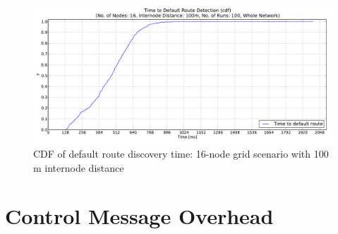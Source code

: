 \begin{figure}[htpb]
  \begin{center}
   \vspace{-20pt}
    \leavevmode
      \includegraphics[scale=0.38]
      {Pics/results/16/MRHOF/grid/dist100_montecarlo_cdf_hist.pdf}
   \caption{CDF of default route discovery time: 16-node grid scenario with 100 m internode distance}
   \end{center}
\end{figure}

\clearpage
\section{Control Message Overhead}
\label{Appx:icmp}

